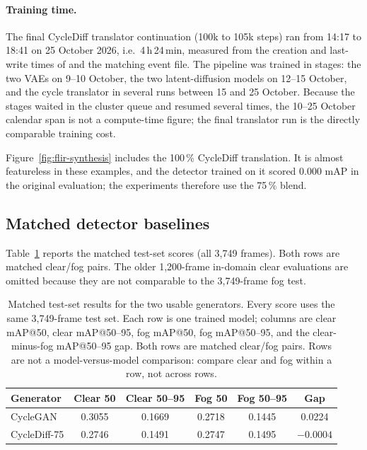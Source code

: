 \documentclass[11pt,a4paper]{article}
\begin{document}
\paragraph{Training time.}
The final CycleDiff translator continuation (100k to 105k steps) ran from
14:17 to 18:41 on 25 October 2026, i.e.\ 4\,h\,24\,min, measured from the
creation and last-write times of  and the matching
event file. The pipeline was trained in stages: the two VAEs on 9--10 October,
the two latent-diffusion models on 12--15 October, and the cycle translator in
several runs between 15 and 25 October. Because the stages waited in the cluster
queue and resumed several times, the 10--25 October calendar span is not a
compute-time figure; the final translator run is the directly comparable
training cost.

Figure~\ref{fig:flir-synthesis} includes the 100\,\% CycleDiff translation. It is
almost featureless in these examples, and the detector trained on it scored
0.000 mAP in the original evaluation; the experiments therefore use the
75\,\% blend.

\subsection{Matched detector baselines}
Table~\ref{tab:flir-original} reports the matched test-set scores (all 3,749
frames). Both rows are matched clear/fog pairs. The older 1,200-frame in-domain
clear evaluations are omitted because they are not comparable to the
3,749-frame fog test.

\begin{table}[H]
\centering
\footnotesize
\setlength{\tabcolsep}{4pt}
\caption{Matched test-set results for the two usable generators. Every score
uses the same 3,749-frame test set. Each row is one trained model; columns are
clear mAP@50, clear mAP@50--95, fog mAP@50, fog mAP@50--95, and the
clear-minus-fog mAP@50--95 gap. Both rows are matched clear/fog pairs. Rows are
not a model-versus-model comparison: compare clear and fog within a row, not
across rows.}
\label{tab:flir-original}
\begin{tabular}{@{}lccccc@{}}
\toprule
Generator & Clear 50 & Clear 50--95 & Fog 50 & Fog 50--95 & Gap \\
\midrule
CycleGAN      & 0.3055 & 0.1669 & 0.2718 & 0.1445 & 0.0224 \\
CycleDiff-75  & 0.2746 & 0.1491 & 0.2747 & 0.1495 & $-0.0004$ \\
\bottomrule
\end{tabular}
\end{table}
\end{document}
